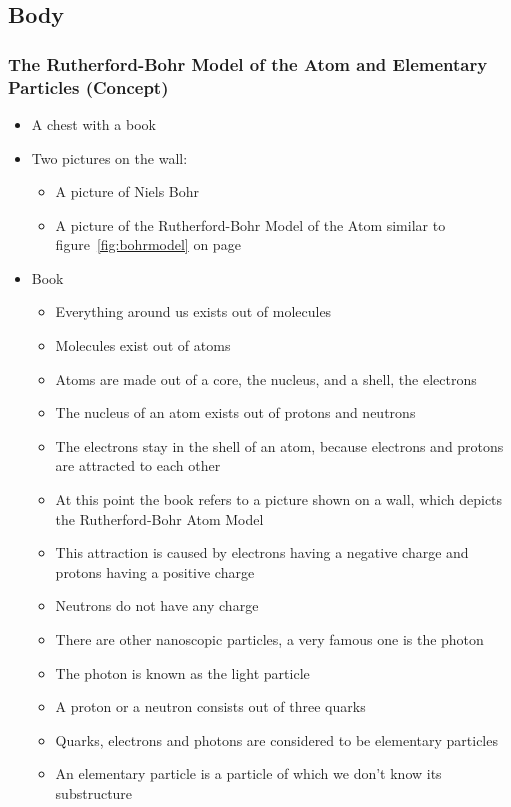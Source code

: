 \documentclass[11pt,twoside]{report} %
\begin{document}
\subsection{Body}

\subsubsection{The Rutherford-Bohr Model of the Atom and Elementary Particles (Concept)}
\begin{itemize}
	\item A chest with a book
	\item Two pictures on the wall:
	\begin{itemize}
		\item A picture of Niels Bohr
		\item A picture of the Rutherford-Bohr Model of the Atom similar to figure~\ref{fig:bohrmodel} on page~\pageref{fig:bohrmodel}
	\end{itemize}
	\item Book
	\begin{itemize}
		\item Everything around us exists out of molecules
		\item Molecules exist out of atoms
		\item Atoms are made out of a core, the nucleus, and a shell, the electrons
		\item The nucleus of an atom exists out of protons and neutrons
		\item The electrons stay in the shell of an atom, because electrons and protons are attracted to each other
		\item At this point the book refers to a picture shown on a wall, which depicts the Rutherford-Bohr Atom Model
		\item This attraction is caused by electrons having a negative charge and protons having a positive charge
		\item Neutrons do not have any charge
		\item There are other nanoscopic particles, a very famous one is the photon
		\item The photon is known as the light particle
		\item A proton or a neutron consists out of three quarks
		\item Quarks, electrons and photons are considered to be elementary particles
		\item An elementary particle is a particle of which we don’t know its substructure

\end{itemize}
\end{itemize}
\end{document}
